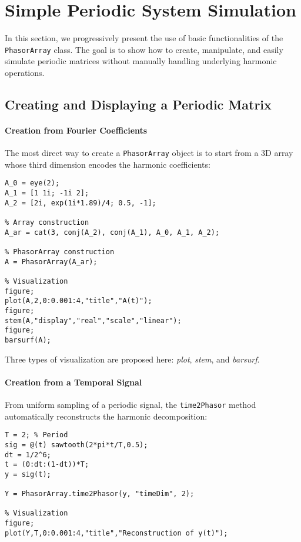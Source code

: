 \documentclass[11pt,a4paper]{article}
\begin{document}
\section{Simple Periodic System Simulation}

In this section, we progressively present the use of basic functionalities of the \texttt{PhasorArray} class. The goal is to show how to create, manipulate, and easily simulate periodic matrices without manually handling underlying harmonic operations.

\subsection{Creating and Displaying a Periodic Matrix}

\paragraph{Creation from Fourier Coefficients}  
The most direct way to create a \texttt{PhasorArray} object is to start from a 3D array whose third dimension encodes the harmonic coefficients:

\begin{lstlisting}[style=matlabstyle]
A_0 = eye(2);
A_1 = [1 1i; -1i 2];
A_2 = [2i, exp(1i*1.89)/4; 0.5, -1];

% Array construction
A_ar = cat(3, conj(A_2), conj(A_1), A_0, A_1, A_2);

% PhasorArray construction
A = PhasorArray(A_ar);

% Visualization
figure;
plot(A,2,0:0.001:4,"title","A(t)");
figure;
stem(A,"display","real","scale","linear");
figure;
barsurf(A);
\end{lstlisting}

Three types of visualization are proposed here: \textit{plot}, \textit{stem}, and \textit{barsurf}.

\paragraph{Creation from a Temporal Signal}  
From uniform sampling of a periodic signal, the \texttt{time2Phasor} method automatically reconstructs the harmonic decomposition:

\begin{lstlisting}[style=matlabstyle]
T = 2; % Period
sig = @(t) sawtooth(2*pi*t/T,0.5);
dt = 1/2^6;
t = (0:dt:(1-dt))*T;
y = sig(t);

Y = PhasorArray.time2Phasor(y, "timeDim", 2);

% Visualization
figure;
plot(Y,T,0:0.001:4,"title","Reconstruction of y(t)");
\end{lstlisting}
\end{document}
